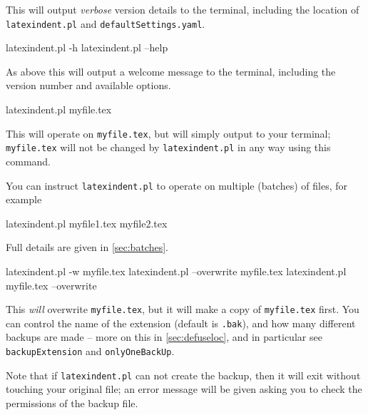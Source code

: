 \documentclass[10pt]{article}
\newcommand{\flagbox}[1]{%
 \par
 \makebox[30pt][l]{%
  \hspace{-1cm}%
  \ttfamily\fontseries{b}\selectfont #1
 }%
}
\begin{document}
 This will output \emph{verbose} version details to the terminal, including the location
 of \texttt{latexindent.pl} and \texttt{defaultSettings.yaml}.

\flagbox{-h, --help}

 \begin{commandshell}
latexindent.pl -h
latexindent.pl --help
\end{commandshell}

 As above this will output a welcome message to the terminal, including the version
 number and available options.

 \begin{commandshell}
latexindent.pl myfile.tex
\end{commandshell}

 This will operate on \texttt{myfile.tex}, but will simply output to your terminal;
 \texttt{myfile.tex} will not be changed by \texttt{latexindent.pl} in any way using this
 command.

 You can  instruct
 \texttt{latexindent.pl} to operate on multiple (batches) of files, for example

 \begin{commandshell}
latexindent.pl myfile1.tex myfile2.tex
\end{commandshell}

 Full details are given in \vref{sec:batches}.

\flagbox{-w, --overwrite}

 \begin{commandshell}
latexindent.pl -w myfile.tex
latexindent.pl --overwrite myfile.tex
latexindent.pl myfile.tex --overwrite 
\end{commandshell}

 This \emph{will} overwrite \texttt{myfile.tex}, but it will make a copy of
 \texttt{myfile.tex} first. You can control the name of the extension (default is
 \texttt{.bak}), and how many different backups are made -- more on this in
 \cref{sec:defuseloc}, and in particular see \texttt{backupExtension} and
 \texttt{onlyOneBackUp}.

 Note that if \texttt{latexindent.pl} can not create the backup, then it will exit
 without touching your original file; an error message will be given asking you to check
 the permissions of the backup file.
\end{document}
